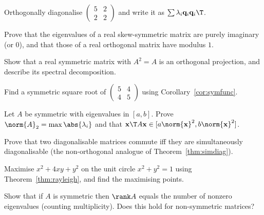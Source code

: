 \begin{exercise}
Orthogonally diagonalise $\begin{pmatrix}5&2\\2&2\end{pmatrix}$ and write it as $\sum\lambda_i\mathbf{q}_i\mathbf{q}_i\T$.
\end{exercise}

\begin{exercise}
Prove that the eigenvalues of a real skew-symmetric matrix are purely imaginary (or $0$), and that those of a real orthogonal matrix have modulus $1$.
\end{exercise}

\begin{exercise}
Show that a real symmetric matrix with $A^2=A$ is an orthogonal projection, and describe its spectral decomposition.
\end{exercise}

\begin{exercise}
Find a symmetric square root of $\begin{pmatrix}5&4\\4&5\end{pmatrix}$ using Corollary~\ref{cor:symfunc}.
\end{exercise}

\begin{exercise}
Let $A$ be symmetric with eigenvalues in $[a,b]$. Prove $\norm{A}_2=\max\abs{\lambda_i}$ and that $\mathbf{x}\T A\mathbf{x}\in[a\norm{\mathbf{x}}^2,b\norm{\mathbf{x}}^2]$.
\end{exercise}

\begin{exercise}
Prove that two diagonalisable matrices commute iff they are simultaneously diagonalisable (the non-orthogonal analogue of Theorem~\ref{thm:simdiag}).
\end{exercise}

\begin{exercise}
Maximise $x^2+4xy+y^2$ on the unit circle $x^2+y^2=1$ using Theorem~\ref{thm:rayleigh}, and find the maximising points.
\end{exercise}

\begin{exercise}
Show that if $A$ is symmetric then $\rank A$ equals the number of nonzero eigenvalues (counting multiplicity). Does this hold for non-symmetric matrices?
\end{exercise}
